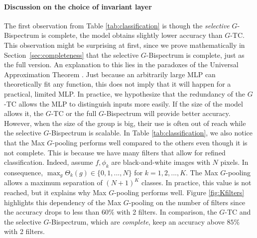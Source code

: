 \documentclass{article}
\theoremstyle{plain}
\theoremstyle{definition}
\theoremstyle{remark}
\begin{document}
\paragraph{Discussion on the choice of invariant layer} The first observation from Table \ref{tab:classification} is though the \emph{selective} $G$-Bispectrum is complete, the model obtains slightly lower accuracy than $G$-TC. This observation might be surprising at first, since we prove mathematically in Section~\ref{sec:completeness} that the selective $G$-Bispectrum is complete, just as the full version. An explanation to this lies in the paradoxes of the Universal Approximation Theorem \citep{HORNIK1989359}. Just because an arbitrarily large MLP can theoretically fit any function, this does not imply that it will happen for a practical, limited MLP. In practice, we hypothesize that the redundancy of the $G$-TC allows the MLP to distinguish inputs more easily. If the size of the model allows it, the $G$-TC or the full $G$-Bispectrum will provide better accuracy. However, when the size of the group is big, their use is often out of reach while the selective $G$-Bispectrum is scalable.
In Table \ref{tab:classification}, we also notice that the Max $G$-pooling performs well compared to the others even though it is not complete. This is because we have many filters that allow for refined classification. Indeed, assume $f,\phi_k$ are black-and-white images with $N$ pixels. In consequence, $\max_g\Theta_k(g)\in\{0,1,...,N\}$ for $k=1,2,...,K$. The Max $G$-pooling allows a maximum separation of $(N+1)^K$ classes. In practice, this value is not reached, but it explains why Max $G$-pooling performs well. Figure \ref{fig:Kfilters} highlights this dependency of the Max $G$-pooling on the number of filters since the accuracy drops to less than $60\%$ with 2 filters. In comparison, the $G$-TC and the selective $G$-Bispectrum, which are \emph{complete}, keep an accuracy above $85\%$ with 2 filters.%
\end{document}
